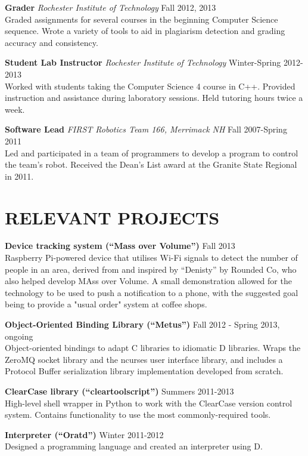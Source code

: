 \documentclass[line]{res}
\begin{document}
\begin{resume}
	\textbf{Grader}
	\textit{Rochester Institute of Technology}
	\hfill
	Fall 2012, 2013\\
	Graded assignments for several courses in the beginning Computer Science sequence.
	Wrote a variety of tools to aid in plagiarism detection and grading accuracy and consistency.

	\textbf{Student Lab Instructor}
	\textit{Rochester Institute of Technology}
	\hfill
	Winter-Spring 2012-2013\\
	Worked with students taking the Computer Science 4 course in C++.
	Provided instruction and assistance during laboratory sessions.
	Held tutoring hours twice a week.

	\textbf{Software Lead}
	\textit{FIRST Robotics Team 166, Merrimack NH}
	\hfill
	Fall 2007-Spring 2011\\
	Led and participated in a team of programmers to develop a program to control the team's robot.
	Received the Dean's List award at the Granite State Regional in 2011.

\section{RELEVANT PROJECTS}

	\textbf{Device tracking system (``Mass over Volume'')}
	\hfill
	Fall 2013
	\\
	Raspberry Pi-powered device that utilises Wi-Fi signals to detect the number of people in an area, derived from and inspired by ``Denisty'' by Rounded Co, who also helped develop MAss over Volume.
	A small demonstration allowed for the technology to be used to push a notification to a phone, with the suggested goal being to provide a "usual order" system at coffee shops.
	
	\textbf{Object-Oriented Binding Library (``Metus'')}
	\hfill
	Fall 2012 - Spring 2013, ongoing
	\\
	Object-oriented bindings to adapt C libraries to idiomatic D libraries.
	Wraps the ZeroMQ socket library and the ncurses user interface library, and includes a Protocol Buffer serialization library implementation developed from scratch.
	
	\textbf{ClearCase library (``cleartoolscript'')}
	\hfill
	Summers 2011-2013
	\\
	High-level shell wrapper in Python to work with the ClearCase version control system. Contains functionality to use the most commonly-required tools.
	
	\textbf{Interpreter (``Oratd'')}
	\hfill
	Winter 2011-2012
	\\
	Designed a programming language and created an interpreter using D.


\end{resume}
\end{document}
